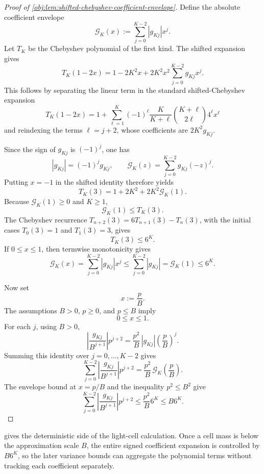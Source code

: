 \documentclass[11pt]{article}
\begin{document}
\begin{proof}[Proof of \cref{obj:lem:shifted-chebyshev-coefficient-envelope}]
Define the absolute coefficient envelope
\[
\mathcal G_K(x)
:=
\sum_{j=0}^{K-2}|g_{Kj}|x^j .
\]
Let \(T_K\) be the Chebyshev polynomial of the first kind. The shifted expansion gives
\[
T_K(1-2x)
=
1-2K^2x
+
2K^2x^2
\sum_{j=0}^{K-2} g_{Kj}x^j .
\] %
This follows by separating the linear term in the standard shifted-Chebyshev expansion
\[
T_K(1-2x)
=
1+
\sum_{\ell=1}^{K}
(-1)^\ell
\frac{K}{K+\ell}
\binom{K+\ell}{2\ell}
4^\ell x^\ell
\]
and reindexing the terms \(\ell=j+2\), whose coefficients are \(2K^2g_{Kj}\). %

Since the sign of \(g_{Kj}\) is \((-1)^j\), one has
\[
|g_{Kj}|=(-1)^jg_{Kj},
\qquad
\mathcal G_K(z)=\sum_{j=0}^{K-2}g_{Kj}(-z)^j .
\] %
Putting \(x=-1\) in the shifted identity therefore yields
\[
T_K(3)=1+2K^2+2K^2\mathcal G_K(1).
\] %
Because \(\mathcal G_K(1)\ge0\) and \(K\ge1\),
\[
\mathcal G_K(1)\le T_K(3).
\] %
The Chebyshev recurrence \(T_{n+2}(3)=6T_{n+1}(3)-T_n(3)\), with the initial cases
\(T_0(3)=1\) and \(T_1(3)=3\), gives
\[
T_K(3)\le 6^K .
\] %
If \(0\le x\le1\), then termwise monotonicity gives
\[
\mathcal G_K(x)
=
\sum_{j=0}^{K-2}|g_{Kj}|x^j
\le
\sum_{j=0}^{K-2}|g_{Kj}|
=
\mathcal G_K(1)
\le 6^K .
\] %

Now set
\[
x:=\frac pB .
\]
The assumptions \(B>0\), \(p\ge0\), and \(p\le B\) imply
\[
0\le x\le1 .
\] %
For each \(j\), using \(B>0\),
\[
\left|\frac{g_{Kj}}{B^{j+1}}\right|p^{j+2}
=
\frac{p^2}{B}\,|g_{Kj}|
\left(\frac pB\right)^j .
\]
Summing this identity over \(j=0,\ldots,K-2\) gives
\[
\sum_{j=0}^{K-2}
\left|\frac{g_{Kj}}{B^{j+1}}\right|p^{j+2}
=
\frac{p^2}{B}\,
\mathcal G_K\!\left(\frac pB\right).
\]
The envelope bound at \(x=p/B\) and the inequality \(p^2\le B^2\) give
\[
\sum_{j=0}^{K-2}
\left|\frac{g_{Kj}}{B^{j+1}}\right|p^{j+2}
\le
\frac{p^2}{B}6^K
\le
B6^K .
\]
\end{proof}

 gives the deterministic side of the light-cell calculation. Once a cell mass is below the approximation scale \(B\), the entire signed coefficient expansion is controlled by \(B6^K\), so the later variance bounds can aggregate the polynomial terms without tracking each coefficient separately.
\end{document}
